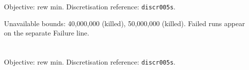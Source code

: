\documentclass[a4paper,10pt]{article}
\begin{document}
\noindent\begin{minipage}{\linewidth}
\section*{\small\texttt{}}
Objective: rew min. Discretisation reference: \texttt{discr005s}.

\begin{minipage}[t]{0.48\linewidth}\centering

\end{minipage}
\hfill
\begin{minipage}[t]{0.48\linewidth}\centering

\end{minipage}
\par\medskip
Unavailable bounds: 40,000,000 (killed), 50,000,000 (killed). Failed runs appear on the separate Failure line.

\end{minipage}\par\bigskip
\noindent\begin{minipage}{\linewidth}
\section*{\small\texttt{}}
Objective: rew min. Discretisation reference: \texttt{discr005s}.

\begin{minipage}[t]{0.48\linewidth}\centering

\end{minipage}
\hfill
\begin{minipage}[t]{0.48\linewidth}\centering

\end{minipage}
\par\medskip
\end{minipage}\par\bigskip
\clearpage
\end{document}
